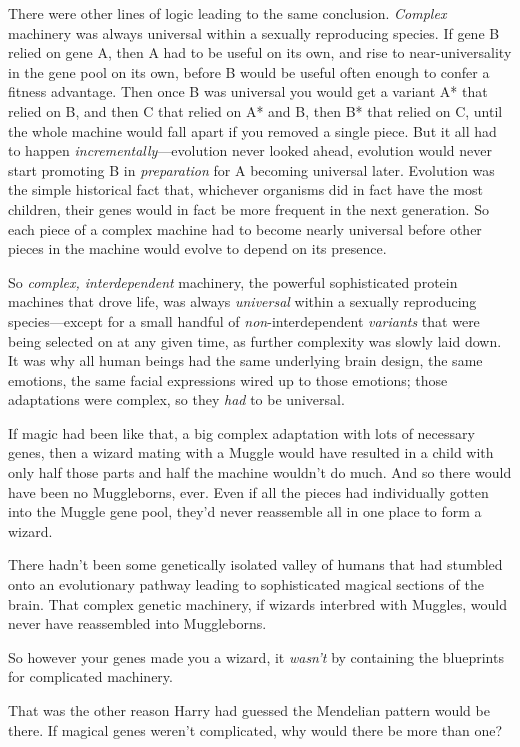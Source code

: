 There were other lines of logic leading to the same conclusion.
\emph{Complex} machinery was always universal within a sexually
reproducing species. If gene B relied on gene A, then A had to be useful
on its own, and rise to near-universality in the gene pool on its own,
before B would be useful often enough to confer a fitness advantage.
Then once B was universal you would get a variant A* that relied on B,
and then C that relied on A* and B, then B* that relied on C, until the
whole machine would fall apart if you removed a single piece. But it all
had to happen \emph{incrementally}---evolution never looked ahead,
evolution would never start promoting B in \emph{preparation} for A
becoming universal later. Evolution was the simple historical fact that,
whichever organisms did in fact have the most children, their genes
would in fact be more frequent in the next generation. So each piece of
a complex machine had to become nearly universal before other pieces in
the machine would evolve to depend on its presence.

So \emph{complex, interdependent} machinery, the powerful sophisticated
protein machines that drove life, was always \emph{universal} within a
sexually reproducing species---except for a small handful of
\emph{non}-interdependent \emph{variants} that were being selected on at
any given time, as further complexity was slowly laid down. It was why
all human beings had the same underlying brain design, the same
emotions, the same facial expressions wired up to those emotions; those
adaptations were complex, so they \emph{had} to be universal.

If magic had been like that, a big complex adaptation with lots of
necessary genes, then a wizard mating with a Muggle would have resulted
in a child with only half those parts and half the machine wouldn't do
much. And so there would have been no Muggleborns, ever. Even if all the
pieces had individually gotten into the Muggle gene pool, they'd never
reassemble all in one place to form a wizard.

There hadn't been some genetically isolated valley of humans that had
stumbled onto an evolutionary pathway leading to sophisticated magical
sections of the brain. That complex genetic machinery, if wizards
interbred with Muggles, would never have reassembled into Muggleborns.

So however your genes made you a wizard, it \emph{wasn't} by containing
the blueprints for complicated machinery.

That was the other reason Harry had guessed the Mendelian pattern would
be there. If magical genes weren't complicated, why would there be more
than one?

